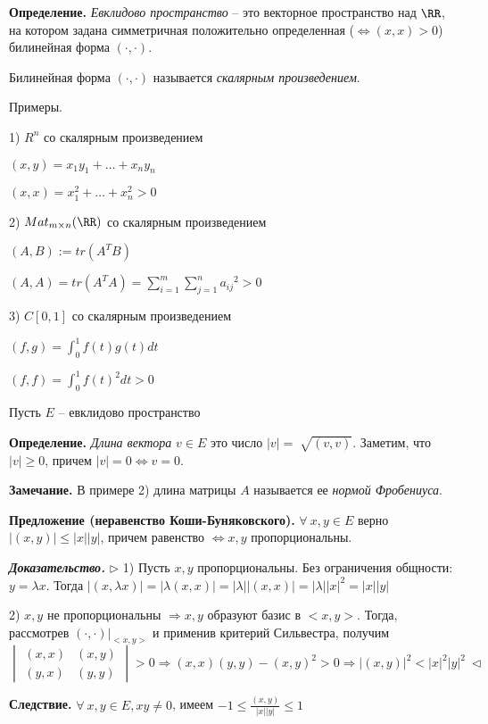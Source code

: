 \textbf{Определение.} \textit{Евклидово пространство} -- это векторное пространство над $\RR$, на котором задана симметричная положительно определенная ($\Leftrightarrow (x, x) > 0$) билинейная форма $(\cdot, \cdot)$.

Билинейная форма $( \cdot, \cdot)$ называется \textit{скалярным произведением}.

\bigskip
Примеры.

1) $R^n$ со скалярным произведением

$(x, y) = x_1 y_1 + \dots + x_n y_n$

$(x, x) = x_1^2 + \dots + x_n^2 > 0$

2) $Mat_{m \times n} (\RR)$ со скалярным произведением

$(A, B) := tr (A^T B)$

$(A, A) = tr (A^T A) = \sum\limits_{i = 1}^m \sum\limits_{j = 1}^n {a_{ij}}^2 > 0$

3) $C[0, 1]$ со скалярным произведением 

$(f, g) = \int_0^1 f(t) g(t) dt$

$(f, f) = \int_0^1 {f(t)^2} dt > 0$

\bigskip
Пусть $E$ -- евклидово пространство

\bigskip
\textbf{Определение.} \textit{Длина вектора} $v \in E$ это число $|v| = \sqrt[]{(v, v)}$. Заметим, что $|v| \geq 0$, причем $|v| = 0 \Leftrightarrow v = 0$.

\bigskip
\textbf{Замечание.} В примере 2) длина матрицы $A$ называется ее \textit{нормой Фробениуса}.

\bigskip
\textbf{Предложение (неравенство Коши-Буняковского).} $\forall \ x, y \in E$ верно $|(x, y)| \leq |x| |y|$, причем равенство $\Leftrightarrow x, y$ пропорциональны.

\bigskip
\textbf{\textit{Доказательство.}} $\rhd$ 1) Пусть $x, y$ пропорциональны. Без ограничения общности: $y = \lambda x$. Тогда $|(x, \lambda x)| = |\lambda(x, x)| = |\lambda||(x, x)| = |\lambda||x|^2 = |x||y|$

2) $x, y$ не пропорциональны $\Rightarrow x, y$ образуют базис в $<x, y>$. Тогда, рассмотрев $(\cdot, \cdot)|_{<x, y>}$ и применив критерий Сильвестра, получим $\begin{vmatrix} (x,x) & (x,y) \\ (y,x) & (y,y) \end{vmatrix} > 0 \Rightarrow (x,x)(y,y) - (x,y)^2 > 0 \Rightarrow |(x, y)|^2 < |x|^2 |y|^2 \ \lhd$

\bigskip
\textbf{Следствие.} $\forall \ x, y \in E, xy \neq 0$, имеем $-1 \leq \frac{(x,y)}{|x||y|} \leq 1$ 

